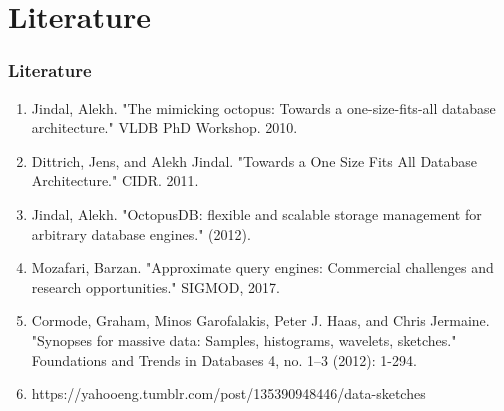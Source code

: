 \documentclass{beamer}
\begin{document}
\section{Literature}
\begin{frame}
\frametitle{Literature}
\begin{enumerate}
\item{Jindal, Alekh. "The mimicking octopus: Towards a one-size-fits-all database architecture." VLDB PhD Workshop. 2010.}
\item{Dittrich, Jens, and Alekh Jindal. "Towards a One Size Fits All Database Architecture." CIDR. 2011.}
\item{Jindal, Alekh. "OctopusDB: flexible and scalable storage management for arbitrary database engines." (2012).}
\item{Mozafari, Barzan. "Approximate query engines: Commercial challenges and research opportunities." SIGMOD, 2017.}
\item{Cormode, Graham, Minos Garofalakis, Peter J. Haas, and Chris Jermaine. "Synopses for massive data: Samples, histograms, wavelets, sketches." Foundations and Trends in Databases 4, no. 1–3 (2012): 1-294.}
\item{https://yahooeng.tumblr.com/post/135390948446/data-sketches}
\end{enumerate}
\end{frame}
\end{document}
